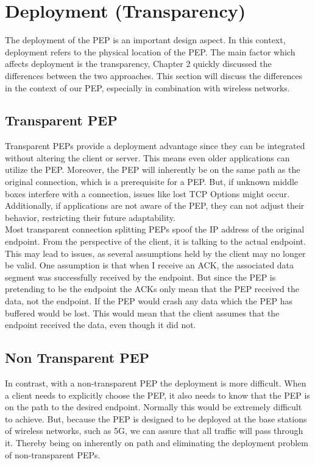 \documentclass[a4paper,english, 11pt]{report}
\begin{document}
\section{Deployment (Transparency)}
The deployment of the PEP is an important design aspect. In this context, deployment refers to the physical location of the PEP. The main factor which affects deployment is the transparency, Chapter 2 quickly discussed the differences between the two approaches. This section will discuss the differences in the context of our PEP, especially in combination with wireless networks.

\subsection{Transparent PEP}
Transparent PEPs provide a deployment advantage since they can be integrated without altering the client or server. This means even older applications can utilize the PEP. Moreover, the PEP will inherently be on the same path as the original connection, which is a prerequisite for a PEP. But, if unknown middle boxes interfere with a connection, issues like lost TCP Options might occur. Additionally, if applications are not aware of the PEP, they can not adjust their behavior, restricting their future adaptability.\\

Most transparent connection splitting PEPs spoof the IP address of the original endpoint. From the perspective of the client, it is talking to the actual endpoint. This may lead to issues, as several assumptions held by the client may no longer be valid. One assumption is that when I receive an ACK, the associated data segment was successfully received by the endpoint. But since the PEP is pretending to be the endpoint the ACKs only mean that the PEP received the data, not the endpoint. If the PEP would crash any data which the PEP has buffered would be lost. This would mean that the client assumes that the endpoint received the data, even though it did not.

\subsection{Non Transparent PEP}
In contrast, with a non-transparent PEP the deployment is more difficult. When a client needs to explicitly choose the PEP, it also needs to know that the PEP is on the path to the desired endpoint. Normally this would be extremely difficult to achieve. But, because the PEP is designed to be deployed at the base stations of wireless networks, such as 5G, we can assure that all traffic will pass through it. Thereby being on inherently on path and eliminating the deployment problem of non-transparent PEPs.\\
\end{document}
